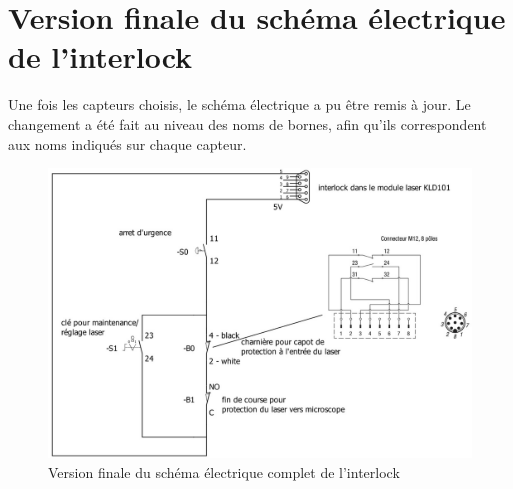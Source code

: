 \section{Version finale du schéma électrique de l'interlock}
Une fois les capteurs choisis, le schéma électrique a pu être remis à jour. Le changement a été fait au niveau des noms de bornes, afin qu'ils correspondent aux noms indiqués sur chaque capteur.

\begin{figure}[H]
    \begin{center}
        \includegraphics[width=\textwidth]{assets/figures/Protections_laser/Securite_electrique/interlock_schema_elec_V2.jpg}
    \end{center}
    \caption{Version finale du schéma électrique complet de l'interlock}
    \label{schema_interlock_v2}
\end{figure}


